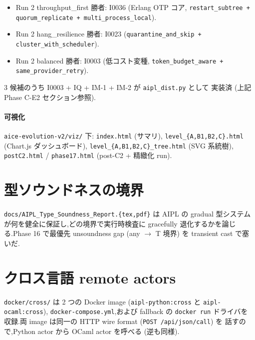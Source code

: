 \documentclass[11pt,a4paper]{article}
\begin{document}
\begin{itemize}\setlength{\itemsep}{0pt}
\item Run 2 throughput\_first 勝者: I0036 (Erlang OTP コア,
       \texttt{restart\_subtree + quorum\_replicate + multi\_process\_local}).
\item Run 2 hang\_resilience 勝者: I0023 (\texttt{quarantine\_and\_skip +
       cluster\_with\_scheduler}).
\item Run 2 balanced 勝者: I0003 (低コスト変種,
       \texttt{token\_budget\_aware + same\_provider\_retry}).
\end{itemize}

3 候補のうち I0003 + IQ + IM-1 + IM-2 が \texttt{aipl\_dist.py} として
実装済 (上記 Phase C-E2 セクション参照).

\paragraph{可視化}
\texttt{aice-evolution-v2/viz/} 下:
\texttt{index.html} (サマリ),
\texttt{level\_\{A,B1,B2,C\}.html} (Chart.js ダッシュボード),
\texttt{level\_\{A,B1,B2,C\}\_tree.html} (SVG 系統樹),
\texttt{postC2.html} / \texttt{phase17.html} (post-C2 + 精緻化 run).

\section{型ソウンドネスの境界}

\texttt{docs/AIPL\_Type\_Soundness\_Report.\{tex,pdf\}} は AIPL の gradual
型システムが何を健全に保証し,どの境界で実行時検査に gracefully
退化するかを論じる.Phase 16 で最優先 unsoundness gap (any $\to$ T 境界)
を transient cast で塞いだ.

\section{クロス言語 remote actors}

\texttt{docker/cross/} は 2 つの Docker image
(\texttt{aipl-python:cross} と \texttt{aipl-ocaml:cross}),
\texttt{docker-compose.yml},および fallback の \texttt{docker run} ドライバを
収録.両 image は同一の HTTP wire format (\texttt{POST /api/json/call}) を
話すので,Python actor から OCaml actor を呼べる (逆も同様).
\end{document}
